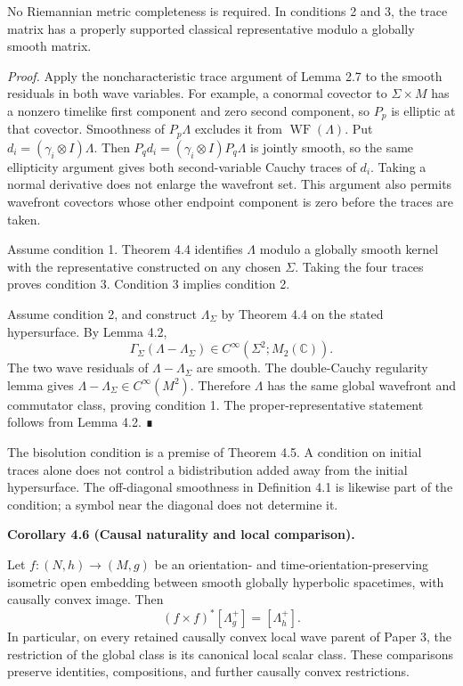\documentclass[
  english,
  11pt,
  reqno]{amsart}
\makeatletter
\newcommand{\pandocstatementheading}[1]{%
  \par\if@nobreak\else
    \addpenalty{\@beginparpenalty}%
    \addvspace{.5\baselineskip plus .2\baselineskip minus .2\baselineskip}%
  \fi
  {\normalfont\bfseries #1\par}%
  \nobreak\@afterindenttrue\@afterheading
}
\makeatother
\begin{document}
No Riemannian metric completeness is required. In conditions 2 and 3,
the trace matrix has a properly supported classical representative
modulo a globally smooth matrix.

\emph{Proof.} Apply the noncharacteristic trace argument of Lemma 2.7 to
the smooth residuals in both wave variables. For example, a conormal
covector to \(\Sigma\times M\) has a nonzero timelike first component
and zero second component, so \(P_p\) is elliptic at that covector.
Smoothness of \(P_p\Lambda\) excludes it from
\(\operatorname{WF}(\Lambda)\). Put \(d_i=(\gamma_i\otimes I)\Lambda\).
Then \(P_qd_i=(\gamma_i\otimes I)P_q\Lambda\) is jointly smooth, so the
same ellipticity argument gives both second-variable Cauchy traces of
\(d_i\). Taking a normal derivative does not enlarge the wavefront set.
This argument also permits wavefront covectors whose other endpoint
component is zero before the traces are taken.

Assume condition 1. Theorem 4.4 identifies \(\Lambda\) modulo a globally
smooth kernel with the representative constructed on any chosen
\(\Sigma\). Taking the four traces proves condition 3. Condition 3
implies condition 2.

Assume condition 2, and construct \(\Lambda_\Sigma\) by Theorem 4.4 on
the stated hypersurface. By Lemma 4.2, \[
\Gamma_\Sigma(\Lambda-\Lambda_\Sigma)
\in C^\infty(\Sigma^2;M_2(\mathbb C)).
\] The two wave residuals of \(\Lambda-\Lambda_\Sigma\) are smooth. The
double-Cauchy regularity lemma gives
\(\Lambda-\Lambda_\Sigma\in C^\infty(M^2)\). Therefore \(\Lambda\) has
the same global wavefront and commutator class, proving condition 1. The
proper-representative statement follows from Lemma 4.2. ∎

The bisolution condition is a premise of Theorem 4.5. A condition on
initial traces alone does not control a bidistribution added away from
the initial hypersurface. The off-diagonal smoothness in Definition 4.1
is likewise part of the condition; a symbol near the diagonal does not
determine it.

\pandocstatementheading{\protect{}\label{cor:p4-causal-wave-naturality}Corollary 4.6 (Causal naturality and local comparison).}

Let \(f:(N,h)\to(M,g)\) be an orientation- and
time-orientation-preserving isometric open embedding between smooth
globally hyperbolic spacetimes, with causally convex image. Then \[
(f\times f)^*[\Lambda_g^+]=[\Lambda_h^+].
\] In particular, on every retained causally convex local wave parent of
Paper 3, the restriction of the global class is its canonical local
scalar class. These comparisons preserve identities, compositions, and
further causally convex restrictions.
\end{document}
